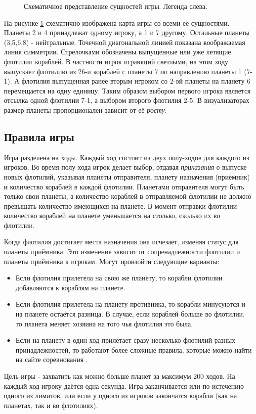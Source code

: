 \documentclass[12pt]{report}
\newenvironment{myItemize}{
	\begin{itemize}
  		\setlength{\itemsep}{1pt}
  		\setlength{\parskip}{0pt}
  		\setlength{\parsep}{0pt}
}{\end{itemize}}
\begin{document}
\begin{figure}[h]
	\centering
	
	\caption{Схематичное представление сущностей игры. Легенда слева.}
	\label{fig:pw_entities}
\end{figure}
На рисунке \ref{fig:pw_entities} схематично изображена карта игры со всеми её сущностями. Планеты 2 и 4 принадлежат одному игроку, а 1 и 7 другому. Остальные планеты (3,5,6,8) - нейтральные. Точечной диагональной линией показана воображаемая линия симметрии. Стрелочками обозначены выпущенные или уже летящие флотилии кораблей. В частности игрок играющий светлыми, на этом ходу выпускает флотилию из 26-и кораблей с планеты 7 по направлению планеты 1 (7-1). А флотилия выпущенная ранее вторым игроком со 2-ой планеты на планету 6 перемещается на одну единицу. Таким образом выбором первого игрока является отсылка одной флотилии 7-1, а выбором второго флотилия 2-5. В визуализаторах размер планеты пропорционален зависит от её \emph{росту}.



\subsection{Правила игры}
\label{sec:game_rules}
Игра разделена на ходы. Каждый ход состоит из двух полу-ходов для каждого из игроков. Во время полу-хода игрок делает выбор, отдавая \emph{приказания} о выпуске новых флотилий, указывая планеты отправителя, планету назначения (приёмник) и количество кораблей в каждой флотилии. Планетами отправителя могут быть только свои планеты, а количество кораблей в отправляемой флотилии не должно превышать количество имеющихся на планете. В момент отправки флотилии количество кораблей на планете уменьшается на столько, сколько их во флотилии.

Когда флотилия достигает места назначения она исчезает, изменяя статус для планеты приёмника. Это изменение зависит от сопренадлежности флотилии и планеты приёмника к игрокам. Могут произойти следующие варианты:
\begin{myItemize}
\item Если флотилия прилетела на свою же планету, то корабли флотилии добавляются к кораблям на планете.
\item Если флотилия прилетела на планету противника, то корабли минусуются и на планете остаётся разница. В случае, если кораблей больше во флотилии, то планета меняет хозяина на того чья флотилия это была.
\item Если на планету в один ход прилетает сразу несколько флотилий разных принадлежностей, то работают более сложные правила, которые можно найти на сайте соревнования \citep{PlanetWarsSpec}.
\end{myItemize}
Цель игры - захватить как можно больше планет за максимум 200 ходов. На каждый ход игроку даётся одна секунда. Игра заканчивается или по истечению одного из лимитов, или если у одного из игроков закончатся корабли (как на планетах, так и во флотилиях). \citep{PlanetWarsSpec}
\end{document}
